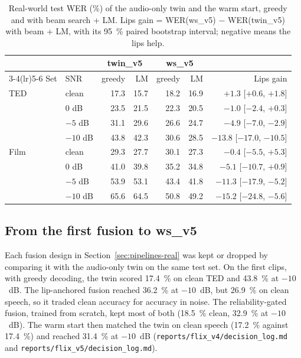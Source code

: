 \begin{table}[t]
\caption{Real-world test WER (\%) of the audio-only twin and the warm start, greedy and with beam
search + LM. Lips gain = WER(ws\_v5) $-$ WER(twin\_v5) with beam + LM, with its 95~\% paired
bootstrap interval; negative means the lips help.}
\label{tab:realworld}
\centering
\setlength{\tabcolsep}{4pt}
\begin{tabular}{llrrrrr}
\toprule
 & & \multicolumn{2}{c}{twin\_v5} & \multicolumn{2}{c}{ws\_v5} & \\
\cmidrule(lr){3-4}\cmidrule(lr){5-6}
Set & SNR & greedy & LM & greedy & LM & Lips gain \\
\midrule
TED  & clean   & 17.3 & 15.7 & 18.2 & 16.9 & $+1.3$ [$+0.6$, $+1.8$] \\
     & 0 dB    & 23.5 & 21.5 & 22.3 & 20.5 & $-1.0$ [$-2.4$, $+0.3$] \\
     & $-5$ dB & 31.1 & 29.6 & 26.6 & 24.7 & $-4.9$ [$-7.0$, $-2.9$] \\
     & $-10$ dB& 43.8 & 42.3 & 30.6 & 28.5 & $-13.8$ [$-17.0$, $-10.5$] \\
\midrule
Film & clean   & 29.3 & 27.7 & 30.1 & 27.3 & $-0.4$ [$-5.5$, $+5.3$] \\
     & 0 dB    & 41.0 & 39.8 & 35.2 & 34.8 & $-5.1$ [$-10.7$, $+0.9$] \\
     & $-5$ dB & 53.9 & 53.1 & 43.4 & 41.8 & $-11.3$ [$-17.9$, $-5.2$] \\
     & $-10$ dB& 65.6 & 64.5 & 50.8 & 49.2 & $-15.2$ [$-24.8$, $-5.6$] \\
\bottomrule
\end{tabular}
\end{table}

\subsection{From the first fusion to ws\_v5}
Each fusion design in Section~\ref{sec:pipelines-real} was kept or dropped by comparing it with
the audio-only twin on the same test set. On the first clips, with greedy decoding, the twin
scored 17.4~\% on clean TED and 43.8~\% at $-10$~dB. The lip-anchored fusion reached 36.2~\% at
$-10$~dB, but 26.9~\% on clean speech, so it traded clean accuracy for accuracy in noise. The
reliability-gated fusion, trained from scratch, kept most of both (18.5~\% clean, 32.9~\% at
$-10$~dB). The warm start then matched the twin on clean speech (17.2~\% against 17.4~\%) and
reached 31.4~\% at $-10$~dB (\texttt{reports/flix\_v4/decision\_log.md} and
\texttt{reports/flix\_v5/decision\_log.md}).

